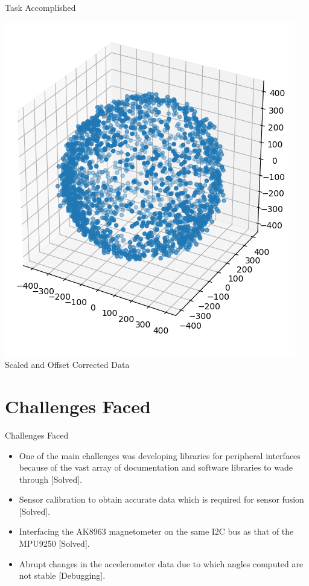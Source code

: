 \documentclass[10pt, a4paper]{beamer}
\begin{document}
\begin{frame}{Task Accomplished}
\begin{center}
\includegraphics[scale=0.45]{scaled}\\
Scaled and Offset Corrected Data
\end{center}
\end{frame}

\section{Challenges Faced}
\begin{frame}{Challenges Faced}
\begin{itemize}
\item One of the main challenges was developing libraries for peripheral interfaces because of the vast array of documentation and software libraries to wade through [Solved].\\
\item Sensor calibration to obtain accurate data which is required for sensor fusion [Solved].\\
\item Interfacing the AK8963 magnetometer on the same I2C bus as that of the MPU9250 [Solved].\\
\item Abrupt changes in the accelerometer data due to which angles computed are not stable [Debugging].
\end{itemize}
\end{frame}
\end{document}
